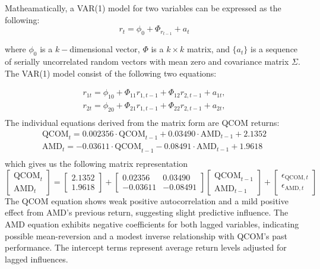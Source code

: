 \documentclass[12pt]{article}
\begin{document}
Matheamatically, a VAR(1) model for two variables can be expressed as the following:
\begin{equation}
	r_t=\phi_0+\Phi_{r_{t-1}}+a_t
\end{equation}

where $\phi_0$ is a $k-$dimensional vector, $\Phi$ is a $k\times k$ matrix, and $\lbrace a_t\rbrace$ is a sequence of serially uncorrelated random vectors with mean zero and covariance matrix $\Sigma$. The VAR(1) model consist of the following two equations:

\begin{equation}
\begin{aligned}
	r_{1t}=\phi_{10}+\Phi_{11}r_{1,t-1}+\Phi_{12}r_{2,t-1}+a_{1t},\\
	r_{2t}=\phi_{20}+\Phi_{21}r_{1,t-1}+\Phi_{22}r_{2,t-1}+a_{2t},\\
\end{aligned}
\end{equation}
The individual equations derived from the matrix form are QCOM returns:
\begin{equation}
\begin{aligned}
	\text{QCOM}_t=0.002356\cdot\text{QCOM}_{t-1}+0.03490\cdot\text{AMD}_{t-1}+2.1352\\
	\text{AMD}_t=-0.03611\cdot\text{QCOM}_{t-1}-0.08491\cdot\text{AMD}_{t-1}+1.9618\\
\end{aligned}
\end{equation}
which gives us the following matrix representation
\begin{equation}
	\begin{bmatrix}
		\text{QCOM}_t \\
		\text{AMD}_t
	\end{bmatrix}
	=
	\begin{bmatrix}
		2.1352 \\
		1.9618
	\end{bmatrix}
	+
	\begin{bmatrix}
		0.02356 & 0.03490 \\
		-0.03611 & -0.08491
	\end{bmatrix}
	\begin{bmatrix}
		\text{QCOM}_{t-1} \\
		\text{AMD}_{t-1}
	\end{bmatrix}
	+
	\begin{bmatrix}
		\epsilon_{\text{QCOM},t} \\
		\epsilon_{\text{AMD},t}
	\end{bmatrix}
\end{equation}
The QCOM equation shows weak positive autocorrelation and a mild positive effect from AMD’s previous return, suggesting slight predictive influence. The AMD equation exhibits negative coefficients for both lagged variables, indicating possible mean-reversion and a modest inverse relationship with QCOM’s past performance. The intercept terms represent average return levels adjusted for lagged influences.
\end{document}
